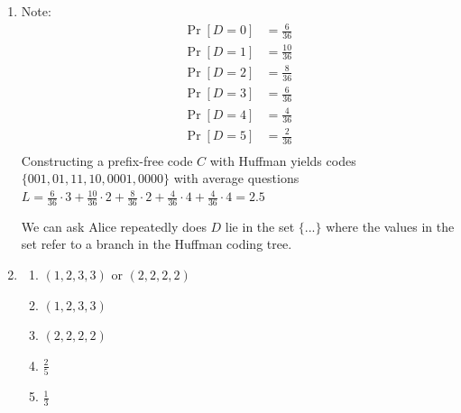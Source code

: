 \documentclass[12pt, a4paper]{article}
\begin{document}
\begin{enumerate}[Q\arabic*.]
\begin{enumerate}
      \item For $0 < i < n$, codeword is $1$ ($i-1$) times and a $0$\\ 
        For $i=n$, codeword is $1$ $(n-1)$ times\\ 
        Length of each codeword is $i$ for $0 < i < n$ and $n$ for $i=n$

      \item We have:
        \begin{align*}
          L &= \sum^{n-1}_{i=1}P_X(a_i)(\ell_i) + P_X(a_n)(\ell_n)\\ 
            &= \sum^{n-1}_{i=1}2^{-i}i + 2^{-n+1}(n-1)\\ 
            &= 2(1-2^{-n+1}) 
        \end{align*}
        which matches the entropy
    \end{enumerate}

  \item Note:
    \begin{align*}
      \Pr[D=0] &= \frac{6}{36}\\
      \Pr[D=1] &= \frac{10}{36}\\
      \Pr[D=2] &= \frac{8}{36}\\
      \Pr[D=3] &= \frac{6}{36}\\
      \Pr[D=4] &= \frac{4}{36}\\
      \Pr[D=5] &= \frac{2}{36}\\
    \end{align*}
    Constructing a prefix-free code $C$ with Huffman yields codes $\{001, 01, 11, 10, 0001, 0000\}$ with average questions $L = \frac{6}{36}\cdot 3 + \frac{10}{36}\cdot 2 + \frac{8}{36}\cdot 2 + \frac{4}{36}\cdot 4 + \frac{4}{36}\cdot 4 = 2.5$

    We can ask Alice repeatedly does $D$ lie in the set $\{...\}$ where the values in the set refer to a branch in the Huffman coding tree.

  \pagebreak
  \item 
    \begin{enumerate}
      \item $(1, 2, 3, 3)$ or $(2, 2, 2, 2)$

      \item $(1, 2, 3, 3)$

      \item $(2, 2, 2, 2)$

      \item $\frac{2}{5}$
      \item $\frac{1}{3}$
    \end{enumerate}

\end{enumerate}
\end{document}
